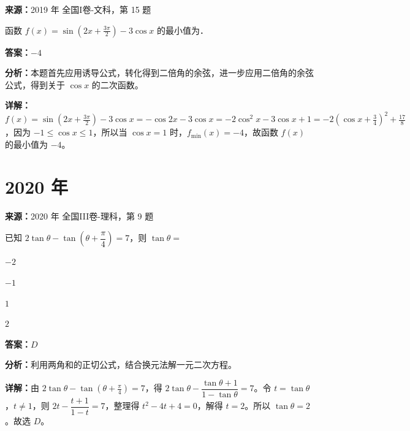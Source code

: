 \begin{question}[points=5]
\textbf{来源：}2019 年 全国I卷-文科，第 15 题\par
函数 $f(x) = \sin(2x+\frac{3\pi}{2}) - 3\cos x$ 的最小值为．
\fillin[{$-4$}]
\begin{solution}
\textbf{答案：}$-4$

\textbf{分析：}本题首先应用诱导公式，转化得到二倍角的余弦，进一步应用二倍角的余弦公式，得到关于 $\cos x$ 的二次函数。

\textbf{详解：}$f(x) = \sin(2x+\frac{3\pi}{2}) - 3\cos x = -\cos 2x - 3\cos x = -2\cos^2 x - 3\cos x + 1 = -2(\cos x + \frac{3}{4})^2 + \frac{17}{8}$，因为 $-1 \le \cos x \le 1$，所以当 $\cos x = 1$ 时，$f_{\min}(x) = -4$，故函数 $f(x)$ 的最小值为 $-4$。
\end{solution}
\end{question}

\section*{2020 年}

\begin{question}[points=5]
\textbf{来源：}2020 年 全国III卷-理科，第 9 题\par
已知 $2\tan\theta-\tan\left(\theta+\dfrac{\pi}{4}\right)=7$，则 $\tan\theta=$
\begin{choices}
  \item $-2$
  \item $-1$
  \item $1$
  \item $2$
\end{choices}
\begin{solution}
\textbf{答案：}$D$

\textbf{分析：}利用两角和的正切公式，结合换元法解一元二次方程。

\textbf{详解：}由 $2\tan\theta-\tan(\theta+\frac{\pi}{4})=7$，得 $2\tan\theta-\dfrac{\tan\theta+1}{1-\tan\theta}=7$。令 $t=\tan\theta$，$t\neq1$，则 $2t-\dfrac{t+1}{1-t}=7$，整理得 $t^2-4t+4=0$，解得 $t=2$。所以 $\tan\theta=2$。故选 $D$。
\end{solution}
\end{question}

